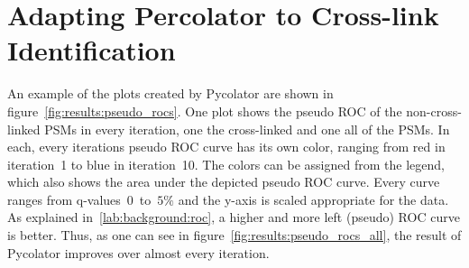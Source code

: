 \section{Adapting Percolator to Cross-link Identification}
\label{lab:results:pseudo_rocs}
An example of the plots created by Pycolator are shown in figure~\ref{fig:results:pseudo_rocs}. One plot shows the pseudo ROC of the non-cross-linked PSMs in every iteration, one the cross-linked and one all of the PSMs. In each, every iterations pseudo ROC curve has its own color, ranging from red in iteration~1 to blue in iteration~10. The colors can be assigned from the legend, which also shows the area under the depicted pseudo ROC curve. Every curve ranges from q-values~$0$~to~$5\%$ and the y-axis is scaled appropriate for the data. As explained in~\ref{lab:background:roc}, a higher and more left (pseudo) ROC curve is better. Thus, as one can see in figure~\ref{fig:results:pseudo_rocs_all}, the result of Pycolator improves over almost every iteration.\\
\renewcommand{\baselinestretch}{0.9}
